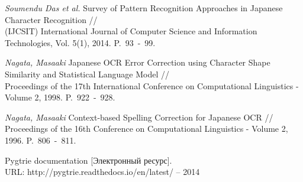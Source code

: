 
\begin{thebibliography}{00}
	
\textit{Soumendu Das et al.} Survey of Pattern Recognition Approaches in Japanese Character Recognition //\\
(IJCSIT) International Journal of Computer Science and Information Technologies, Vol. 5(1), 2014. P.~93~-~99.

\textit{Nagata, Masaaki} Japanese OCR Error Correction using Character Shape Similarity and Statistical Language Model //\\
Proceedings of the 17th International Conference on Computational Linguistics - Volume 2, 1998. P.~922~-~928.

\textit{Nagata, Masaaki} Context-based Spelling Correction for Japanese OCR //\\
Proceedings of the 16th Conference on Computational Linguistics - Volume 2, 1996. P.~806~-~811.

 Pygtrie documentation [Электронный ресурс]. \\ URL: http://pygtrie.readthedocs.io/en/latest/ -- 2014

\end{thebibliography}